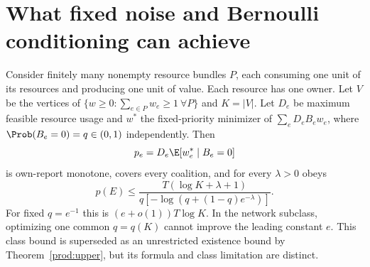 \section{What fixed noise and Bernoulli conditioning can achieve}\label{noise:laws}
\begin{theorem}\label{noise:bernoulli}
Consider finitely many nonempty resource bundles $P$, each consuming one
unit of its resources and producing one unit of value. Each resource has
one owner. Let $V$ be the vertices of
$\{w\ge0:\sum_{e\in P}w_e\ge1\ \forall P\}$ and $K=|V|$.
Let $D_e$ be maximum feasible resource usage and $w^*$ the fixed-priority
minimizer of $\sum_eD_eB_ew_e$, where $\Prob(B_e=0)=q\in(0,1)$ independently.
Then
\[
 p_e=D_e\E[w_e^*\mid B_e=0]
\]
is own-report monotone, covers every coalition, and for every $\lambda>0$
obeys
\[
 p(E)\le\frac{T(\log K+\lambda+1)}
 {q[-\log(q+(1-q)e^{-\lambda})]}.
\]
For fixed $q=e^{-1}$ this is $(e+o(1))T\log K$. In the network subclass,
optimizing one common $q=q(K)$ cannot improve the leading constant $e$.
This class bound is superseded as an unrestricted existence bound by
Theorem~\ref{prod:upper}, but its formula and class limitation are distinct.
\end{theorem}
